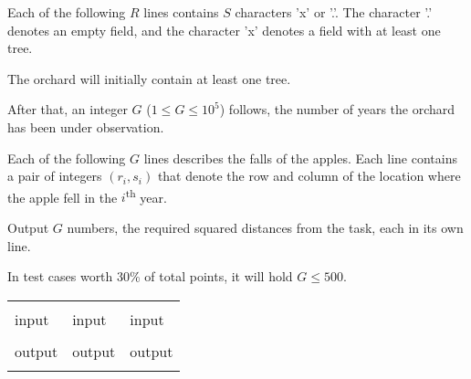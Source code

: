 Each of the following $R$ lines contains $S$ characters 'x' or '.'. The character '.' denotes an empty field, and the character 'x' denotes a field with at least one tree.

The orchard will initially contain at least one tree.

After that, an integer $G$ ($1 \leqslant G \leqslant 10^5$) follows, the number of years the orchard has been under observation.

Each of the following $G$ lines describes the falls of the apples. Each line contains a pair of integers $(r_i, s_i)$ that denote the row and column of the location where the apple fell in the $i$\textsuperscript{th} year.

\strut


Output $G$ numbers, the required squared distances from the task, each in its own line.

\strut


In test cases worth 30\% of total points, it will hold $G \leqslant 500$.

\pagebreak


\begin{center}
\fontfamily{\ttdefault}
\fontsize{10pt}{1em}
\selectfont
\begin{tabu}to 0.99\textwidth{|X[1]|X[1]|X[1]|}
\hline
& & \\ 
\rowfont{\fontsize{10pt}{1em}\bfseries}
input & input & input\\
 &
 & 
 \\
\rowfont{\fontsize{10pt}{1em}\bfseries}
output & output & output\\
 &
 & 
 \\
\hline
\end{tabu}
\end{center}

